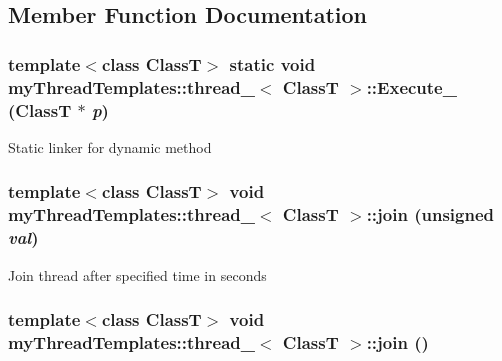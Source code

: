 \subsection{Member Function Documentation}
\hypertarget{classmyThreadTemplates_1_1thread__1_a24e615ac4afa0d376faefd500ed47e43}{
\subsubsection[{Execute\_\-}]{\setlength{\rightskip}{0pt plus 5cm}template$<$class ClassT$>$ static void {\bf myThreadTemplates::thread\_}$<$ ClassT $>$::Execute\_\- (ClassT $\ast$ {\em p})}}
\label{classmyThreadTemplates_1_1thread__1_a24e615ac4afa0d376faefd500ed47e43}


Static linker for dynamic method 

\hypertarget{classmyThreadTemplates_1_1thread__1_a9a0372afc5bd30783dde8fed70df908c}{
\subsubsection[{join}]{\setlength{\rightskip}{0pt plus 5cm}template$<$class ClassT$>$ void {\bf myThreadTemplates::thread\_}$<$ ClassT $>$::join (unsigned {\em val})}}
\label{classmyThreadTemplates_1_1thread__1_a9a0372afc5bd30783dde8fed70df908c}


Join thread after specified time in seconds 

\hypertarget{classmyThreadTemplates_1_1thread__1_ae393ee33ecbfee158a03a4c0f21cf95c}{
\subsubsection[{join}]{\setlength{\rightskip}{0pt plus 5cm}template$<$class ClassT$>$ void {\bf myThreadTemplates::thread\_}$<$ ClassT $>$::join ()}}
\label{classmyThreadTemplates_1_1thread__1_ae393ee33ecbfee158a03a4c0f21cf95c}


